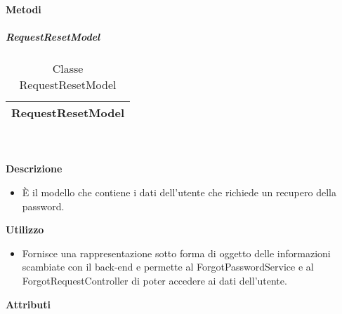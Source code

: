 		\textbf{Metodi} 
	\begin{itemize}
		\end{itemize}
			\subparagraph{RequestResetModel} 
\begin{table}[ht]
\begin{center}
\bgroup
	\setlength{\arrayrulewidth}{0.6mm}
	\def\arraystretch{1}
		\begin{tabular}{ | p{12cm} | }
				\hline  
					\centerline{\textbf{RequestResetModel}}
		\\ \hline 
				\hline
				\hline
		
		\end{tabular}
\egroup
\caption{Classe RequestResetModel}
\end{center}
\end{table}  \textbf{\\ \\ Descrizione} 
					\begin{itemize}
						\item[] È il modello che contiene i dati dell'utente che richiede un recupero della password.
					\end{itemize}      
				\textbf{Utilizzo}  
					\begin{itemize}
						\item[] Fornisce una rappresentazione sotto forma di oggetto delle informazioni scambiate con il back-end e permette al ForgotPasswordService e al ForgotRequestController di poter accedere ai dati dell'utente.
					\end{itemize}
			 \textbf{Attributi} 
	\begin{itemize}
		\end{itemize}
		
